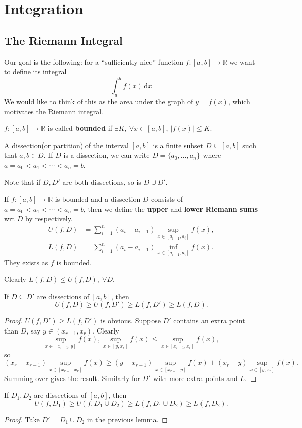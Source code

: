 \section{Integration}
\subsection{The Riemann Integral}
Our goal is the following: for a ``sufficiently nice'' function $f:[a,b]\to\mathbb R$ we want to define its integral
$$\int_a^bf(x)\,\mathrm dx$$
We would like to think of this as the area under the graph of $y=f(x)$, which motivates the Riemann integral.
\begin{definition}
    $f:[a,b]\to \mathbb{R}$ is called \textbf{bounded} if $ \exists K,\ \forall x\in [a,b],\ |f(x)|\le K $. 
\end{definition}
\begin{definition}
    A dissection(or partition) of the interval $[a,b]$ is a finite subset $D\subseteq [a,b]$ such that $a,b\in D$.
    If $D$ is a dissection, we can write $D=\{a_0,\ldots,a_n\}$ where $a=a_0<a_1<\cdots<a_n=b$.
\end{definition}
Note that if $D,D'$ are both dissections, so is $D\cup D'$.
\begin{definition}
    If $f:[a,b]\to\mathbb R$ is bounded and a dissection $D$ consists of $a=a_0<a_1<\cdots<a_n=b$, then we define the \textbf{upper} and \textbf{lower} \textbf{Riemann sums} wrt $D$ by
    respectively.
    \begin{align*}
        U(f,D)&=\sum_{i=1}^n(a_i-a_{i-1})\sup_{x\in [a_{i-1},a_i]}f(x),\\ 
        L(f,D)&=\sum_{i=1}^n(a_i-a_{i-1})\inf_{x\in [a_{i-1},a_i]}f(x).
    \end{align*}
    They exists as $f$ is bounded.
\end{definition}
Clearly $ L(f,D)\le U(f,D),\ \forall D $.
\begin{lemma}\label{lma:5.1}
    If $D\subseteq D'$ are dissections of $[a,b]$, then 
    \[
        U(f,D)\ge U(f,D')\ge L(f,D')\ge L(f,D).
    \]
\end{lemma}
\begin{proof}
    $U(f,D')\ge L(f,D')$ is obvious. Suppose $ D' $ contains an extra point than $D$, say $ y\in (x_{r-1},x_r) $. Clearly 
    \[
        \sup_{x\in [x_{r-1},y]}f(x),\sup_{x\in [y,x_r]}f(x)\le \sup_{x\in [x_{r-1},x_r]}f(x),
    \]
    so 
    \[
        (x_r-x_{r-1})\sup_{x\in [x_{r-1},x_r]}f(x)\ge (y-x_{r-1})\sup_{x\in [x_{r-1},y]}f(x)+(x_r-y)\sup_{x\in [y,x_r]}f(x).
    \]
    Summing over gives the result. Similarly for $D'$ with more extra points and $ L $.
\end{proof}
\begin{lemma}
    If $D_1,D_2$ are dissections of $[a,b]$, then
    \[
        U(f,D_1)\ge U(f,D_1 \cup D_2)\ge L(f,D_1 \cup D_2)\ge L(f,D_2).
    \]
\end{lemma}
\begin{proof}
    Take $ D'=D_1 \cup D_2 $ in the previous lemma.
\end{proof}

